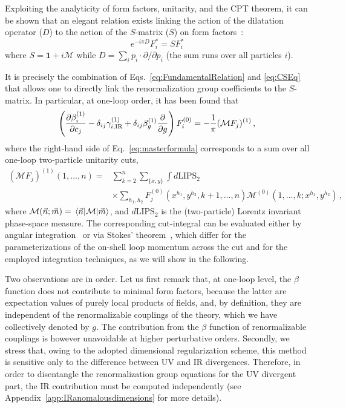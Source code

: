 %
Exploiting the analyticity of form factors, unitarity, and the CPT theorem, it can be shown that an elegant relation exists linking the action of the dilatation operator ($D$)
%
to the action of the $S$-matrix ($S$) on form factors~\cite{Caron-Huot:2016cwu}:
%
\begin{equation}
\label{eq:FundamentalRelation}
    e^{-i \pi D}F_i^* = SF_i^*
\end{equation}
%
where $S=\mathbf{1} + i\mathcal{M}$ while $D = \sum_{i}p_i\cdot \partial/\partial p_i$
(the sum runs over all particles $i$). 

It is precisely the combination of Eqs.~\eqref{eq:FundamentalRelation} and \eqref{eq:CSEq} that allows one to directly link the renormalization group coefficients to the $S$-matrix.
%
In particular, at one-loop order, it has been found that
%
\begin{equation}
\label{eq:masterformula}
\left(
\frac{\partial \beta_i^{(1)}}{\partial c_j}
-\delta_{ij}\gamma_{i,\textup{IR}}^{(1)} 
+\delta_{ij}\beta_g^{(1)}\frac{\partial}{\partial g}
\right)
F_i^{(0)} = -\frac{1}{\pi}(\mathcal M F_j)^{(1)}\,, 
\end{equation}
%
where the right-hand side of Eq.~\eqref{eq:masterformula} corresponds to a sum over all one-loop two-particle unitarity cuts,
%
\begin{align}
\label{eq:MF1Loop}
    (\mathcal M F_j)^{(1)}(1,\dots,n) = 
   &\sum_{k=2}^n \sum_{\{x,y\}}\int d\text{LIPS}_2
   \nonumber\\ 
   &\times\sum_{h_1,h_2}\!\! F_j^{(0)}\!(x^{h_1},y^{h_2},k \!+\! 1,\dots,n) \mathcal M^{(0)}\!(1,\dots,k;x^{h_1},y^{h_2}\!)\, ,
\end{align}
where $\mathcal M(\vec n; \vec m)=\mel*{\vec n}{\mathcal M}{\vec m}$, and $d\text{LIPS}_2$ is the (two-particle) Lorentz invariant phase-space measure. 
The corresponding cut-integral can be evaluated either by angular integration~\cite{Zwiebel:2011bx} or via Stokes' theorem~\cite{Mastrolia:2009dr},
which differ for the parameterizations of the on-shell loop momentum across the cut and for the employed integration techniques, 
as we will show in the following.

Two observations are in order. 
Let us first remark that, at one-loop level, the $\beta$ function does not contribute to minimal form factors, because 
the latter are expectation values of purely local products of fields, and, by definition, they are independent of the renormalizable couplings of the theory, which we have collectively denoted by $g$.
The contribution from the $\beta$ function of renormalizable couplings is however unavoidable at higher perturbative orders.
%
Secondly, we stress that, owing to the adopted dimensional regularization scheme, this method is sensitive only to the difference between UV and IR divergences. 
Therefore, in order to disentangle the renormalization group equations for the UV divergent part, the IR contribution must be computed independently (see Appendix~\ref{app:IRanomalousdimensions} for more details). 

